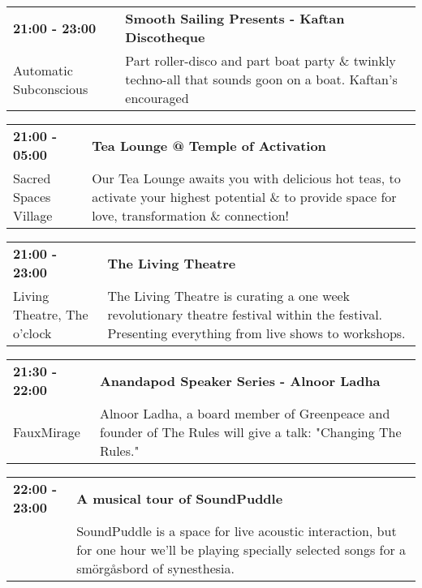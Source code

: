\begin{tabular}{ p{1in} p{2.2in} }
    \textbf{21:00 - 23:00} & \textbf{Smooth Sailing Presents - Kaftan Discotheque} \\
    Automatic Subconscious \newline  & Part roller-disco and part boat party \& twinkly techno-all that sounds goon on a boat. Kaftan's encouraged \\
    \hline 
\end{tabular}
    
\begin{tabular}{ p{1in} p{2.2in} }
    \textbf{21:00 - 05:00} & \textbf{Tea Lounge @ Temple of Activation } \\
    Sacred Spaces Village \newline  & Our Tea Lounge awaits you with delicious hot teas, to activate your highest potential \& to provide space for love, transformation \& connection! \\
    \hline 
\end{tabular}
    
\begin{tabular}{ p{1in} p{2.2in} }
    \textbf{21:00 - 23:00} & \textbf{The Living Theatre} \\
    Living Theatre, The \newline 6 o'clock & The Living Theatre is curating a one week revolutionary theatre festival within the festival. Presenting everything from live shows to workshops. \\
    \hline 
\end{tabular}
    
\begin{tabular}{ p{1in} p{2.2in} }
    \textbf{21:30 - 22:00} & \textbf{Anandapod Speaker Series - Alnoor Ladha} \\
    FauxMirage \newline  & Alnoor Ladha, a board member of Greenpeace and founder of The Rules will give a talk: "Changing The Rules." \\
    \hline 
\end{tabular}
    
\begin{tabular}{ p{1in} p{2.2in} }
    \textbf{22:00 - 23:00} & \textbf{A musical tour of SoundPuddle} \\
    ~ \newline  & SoundPuddle is a space for live acoustic interaction, but for one hour we'll be playing specially selected songs for a sm\"org\aa sbord of synesthesia. \\
    \hline 
\end{tabular}
    
